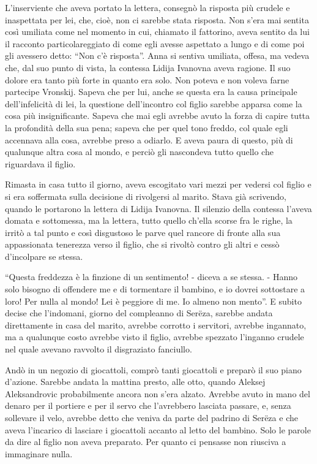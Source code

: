 L'inserviente che aveva portato la lettera, consegnò la risposta più crudele e inaspettata per lei, che, cioè, non ci sarebbe stata risposta. Non s'era mai sentita così umiliata come nel momento in cui, chiamato il fattorino, aveva sentito da lui il racconto particolareggiato di come egli avesse aspettato a lungo e di come poi gli avessero detto: ``Non c'è risposta''. Anna si sentiva umiliata, offesa, ma vedeva che, dal suo punto di vista, la contessa Lidija Ivanovna aveva ragione. Il suo dolore era tanto più forte in quanto era solo. Non poteva e non voleva farne partecipe Vronskij. Sapeva che per lui, anche se questa era la causa principale dell'infelicità di lei, la questione dell'incontro col figlio sarebbe apparsa come la cosa più insignificante. Sapeva che mai egli avrebbe avuto la forza di capire tutta la profondità della sua pena; sapeva che per quel tono freddo, col quale egli accennava alla cosa, avrebbe preso a odiarlo. E aveva paura di questo, più di qualunque altra cosa al mondo, e perciò gli nascondeva tutto quello che riguardava il figlio. 

Rimasta in casa tutto il giorno, aveva escogitato vari mezzi per vedersi col figlio e si era soffermata sulla decisione di rivolgersi al marito. Stava già scrivendo, quando le portarono la lettera di Lidija Ivanovna. Il silenzio della contessa l'aveva domata e sottomessa, ma la lettera, tutto quello ch'ella scorse fra le righe, la irritò a tal punto e così disgustoso le parve quel rancore di fronte alla sua appassionata tenerezza verso il figlio, che si rivoltò contro gli altri e cessò d'incolpare se stessa. 

``Questa freddezza è la finzione di un sentimento! - diceva a se stessa. - Hanno solo bisogno di offendere me e di tormentare il bambino, e io dovrei sottostare a loro! Per nulla al mondo! Lei è peggiore di me. Io almeno non mento''. E subito decise che l'indomani, giorno del compleanno di Serëza, sarebbe andata direttamente in casa del marito, avrebbe corrotto i servitori, avrebbe ingannato, ma a qualunque costo avrebbe visto il figlio, avrebbe spezzato l'inganno crudele nel quale avevano ravvolto il disgraziato fanciullo. 

Andò in un negozio di giocattoli, comprò tanti giocattoli e preparò il suo piano d'azione. Sarebbe andata la mattina presto, alle otto, quando Aleksej Aleksandrovic probabilmente ancora non s'era alzato. Avrebbe avuto in mano del denaro per il portiere e per il servo che l'avrebbero lasciata passare, e, senza sollevare il velo, avrebbe detto che veniva da parte del padrino di Serëza e che aveva l'incarico di lasciare i giocattoli accanto al letto del bambino. Solo le parole da dire al figlio non aveva preparato. Per quanto ci pensasse non riusciva a immaginare nulla. 

